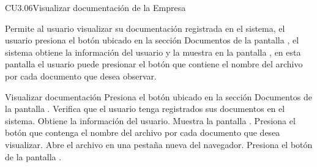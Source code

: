 \begin{UseCase}{CU3.06}{Visualizar documentación de la Empresa}{
    Permite al usuario  visualizar su documentación registrada en el sistema, el usuario presiona el botón   ubicado en la sección  Documentos  de la pantalla , el sistema obtiene la información del usuario y la muestra en la pantalla , en esta pantalla el usuario puede presionar el botón que contiene el nombre del archivo  por cada documento que desea observar.
       
    \bigskip
}
		
\end{UseCase}
	
	\begin{UCtrayectoria}{Visualizar documentación }
		\UCpaso[\UCactor]Presiona el botón  ubicado en la sección Documentos de la pantalla .
		\UCpaso[\UCsist] Verifica que el usuario tenga registrados sus documentos en el sistema.
		\UCpaso[\UCsist] Obtiene la información del usuario.
		\UCpaso[\UCsist] Muestra la pantalla .
		\UCpaso[\UCactor]Presiona el botón que contenga el nombre del archivo  por cada documento que desea visualizar.
		\UCpaso[\UCsist] Abre el archivo en una pestaña nueva del navegador.
        \UCpaso[\UCactor]Presiona el botón  de la pantalla .
		
	\end{UCtrayectoria}
	

